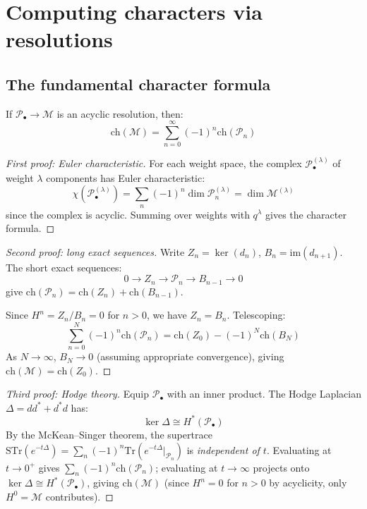 \section{Computing characters via resolutions}\label{sec:computing-characters}

\subsection{The fundamental character formula}

\begin{theorem}\label{thm:character-acyclic-resolution}
If $\mathcal{P}_\bullet \to \mathcal{M}$ is an acyclic resolution, then:
\[
\text{ch}(\mathcal{M}) = \sum_{n=0}^\infty (-1)^n \text{ch}(\mathcal{P}_n)
\]
\end{theorem}

\begin{proof}[First proof: Euler characteristic]
For each weight space, the complex $\mathcal{P}_\bullet^{(\lambda)}$ of weight $\lambda$ components has Euler characteristic:
\[
\chi(\mathcal{P}_\bullet^{(\lambda)}) = \sum_n (-1)^n \dim \mathcal{P}_n^{(\lambda)} = \dim \mathcal{M}^{(\lambda)}
\]
since the complex is acyclic. Summing over weights with $q^{\lambda}$ gives the character formula.
\end{proof}

\begin{proof}[Second proof: long exact sequences]
Write $Z_n = \ker(d_n)$, $B_n = \text{im}(d_{n+1})$. The short exact sequences:
\[
0 \to Z_n \to \mathcal{P}_n \to B_{n-1} \to 0
\]
give $\text{ch}(\mathcal{P}_n) = \text{ch}(Z_n) + \text{ch}(B_{n-1})$.

Since $H^n = Z_n/B_n = 0$ for $n > 0$, we have $Z_n = B_n$. Telescoping:
\[
\sum_{n=0}^N (-1)^n \text{ch}(\mathcal{P}_n) = \text{ch}(Z_0) - (-1)^N \text{ch}(B_N)
\]
As $N \to \infty$, $B_N \to 0$ (assuming appropriate convergence), giving $\text{ch}(\mathcal{M}) = \text{ch}(Z_0)$.
\end{proof}

\begin{proof}[Third proof: Hodge theory]
Equip $\mathcal{P}_\bullet$ with an inner product. The Hodge Laplacian $\Delta = dd^* + d^*d$ has:
\[
\ker \Delta \cong H^*(\mathcal{P}_\bullet)
\]
By the McKean--Singer theorem, the supertrace $\mathrm{STr}(e^{-t\Delta}) = \sum_n (-1)^n \mathrm{Tr}(e^{-t\Delta}|_{\mathcal{P}_n})$ is \emph{independent of $t$}.  Evaluating at $t \to 0^+$ gives $\sum_n (-1)^n \mathrm{ch}(\mathcal{P}_n)$; evaluating at $t \to \infty$ projects onto $\ker \Delta \cong H^*(\mathcal{P}_\bullet)$, giving $\mathrm{ch}(\mathcal{M})$ (since $H^n = 0$ for $n > 0$ by acyclicity, only $H^0 = \mathcal{M}$ contributes).
\end{proof}

